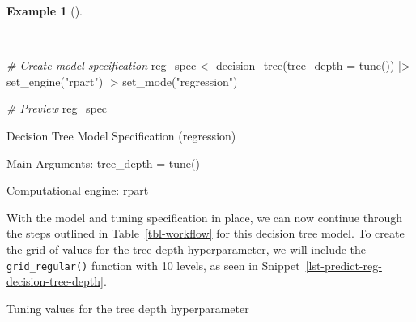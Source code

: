 \documentclass[
  letterpaper,
]{latex/krantz}
\newenvironment{Shaded}{\begin{snugshade}}{\end{snugshade}}
\newcommand{\AttributeTok}[1]{\textcolor[rgb]{0.00,0.00,0.00}{#1}}
\newcommand{\CommentTok}[1]{\textcolor[rgb]{0.00,0.00,0.00}{\textit{#1}}}
\newcommand{\DecValTok}[1]{\textcolor[rgb]{0.00,0.00,0.00}{#1}}
\newcommand{\FunctionTok}[1]{\textcolor[rgb]{0.00,0.00,0.00}{#1}}
\newcommand{\NormalTok}[1]{\textcolor[rgb]{0.00,0.00,0.00}{#1}}
\newcommand{\OtherTok}[1]{\textcolor[rgb]{0.00,0.00,0.00}{#1}}
\newcommand{\SpecialCharTok}[1]{\textcolor[rgb]{0.00,0.00,0.00}{#1}}
\newcommand{\StringTok}[1]{\textcolor[rgb]{0.00,0.00,0.00}{#1}}
\theoremstyle{definition}
\newtheorem{example}{Example}[chapter]
\theoremstyle{remark}
\begin{document}
\begin{example}[]\protect\hypertarget{exm-predict-reg-model-spec-decision-tree}{}\label{exm-predict-reg-model-spec-decision-tree}

~

\begin{Shaded}
\begin{Highlighting}[]
\CommentTok{\# Create model specification}
\NormalTok{reg\_spec }\OtherTok{\textless{}{-}}
  \FunctionTok{decision\_tree}\NormalTok{(}\AttributeTok{tree\_depth =} \FunctionTok{tune}\NormalTok{()) }\SpecialCharTok{|\textgreater{}}
  \FunctionTok{set\_engine}\NormalTok{(}\StringTok{"rpart"}\NormalTok{) }\SpecialCharTok{|\textgreater{}}
  \FunctionTok{set\_mode}\NormalTok{(}\StringTok{"regression"}\NormalTok{)}

\CommentTok{\# Preview}
\NormalTok{reg\_spec}
\end{Highlighting}
\end{Shaded}

\begin{Shaded}
\begin{Highlighting}[]
\NormalTok{Decision Tree Model Specification (regression)}

\NormalTok{Main Arguments:}
\NormalTok{  tree\_depth = tune()}

\NormalTok{Computational engine: rpart}
\end{Highlighting}
\end{Shaded}

\end{example}

With the model and tuning specification in place, we can now continue
through the steps outlined in Table~\ref{tbl-workflow} for this decision
tree model. To create the grid of values for the tree depth
hyperparameter, we will include the \texttt{grid\_regular()} function
with 10 levels, as seen in
Snippet~\ref{lst-predict-reg-decision-tree-depth}.

\begin{codelisting}

\caption{\label{lst-predict-reg-decision-tree-depth}Tuning values for
the tree depth hyperparameter}

\centering{

\begin{Shaded}
\begin{Highlighting}[]
\NormalTok{reg\_grid }\OtherTok{\textless{}{-}}
  \FunctionTok{grid\_regular}\NormalTok{(}\FunctionTok{tree\_depth}\NormalTok{(), }\AttributeTok{levels =} \DecValTok{10}\NormalTok{)}
\end{Highlighting}
\end{Shaded}

}

\end{codelisting}%
\end{document}
